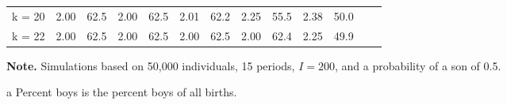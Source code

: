 \documentclass[12pt,letterpaper]{article}
\begin{document}
\begin{table}[!htp]
\begin{threeparttable}
\begin{tabular}{@{} c D{.}{.}{1.2} D{.}{.}{1.2} D{.}{.}{1.2} D{.}{.}{2.2} D{.}{.}{1.2} D{.}{.}{1.2} D{.}{.}{2.2} D{.}{.}{1.2} D{.}{.}{1.2} D{.}{.}{2.2} D{.}{.}{1.2} D{.}{.}{1.2} @{}}
 k = 20        &  2.00 &  62.5 &  2.00 &  62.5 &  2.01 &  62.2 &  2.25 &  55.5 &  2.38 &  50.0 \\
 k = 22        &  2.00 &  62.5 &  2.00 &  62.5 &  2.00 &  62.5 &  2.00 &  62.4 &  2.25 &  49.9 \\
\bottomrule
\end{tabular}
\begin{tablenotes} \scriptsize
\item \hspace*{-0.5em} \textbf{Note.} Simulations based on  50,000 individuals, 15 periods, $ I = 200 $,
 and a probability of a son of 0.5.
\item[a]Percent boys is the percent boys of all births.
\end{tablenotes}
\end{threeparttable}
\normalsize
\end{table}
\end{document}
